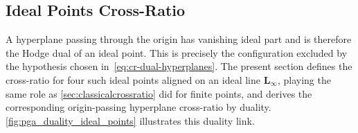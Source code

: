 \documentclass{birkjour}
\theoremstyle{definition}
\theoremstyle{remark}
\begin{document}
\subsection{Ideal Points Cross-Ratio}
\label{sec:ideal-cr}

A hyperplane passing through the origin has vanishing ideal part and is therefore the Hodge dual of an ideal point. This is precisely the configuration excluded by the hypothesis chosen in~\eqref{eq:cr-dual-hyperplanes}. The present section defines the cross-ratio for four such ideal points aligned on an ideal line $\mathbf{L}_\infty$, playing the same role as \cref{sec:classicalcrossratio} did for finite points, and derives the corresponding origin-passing hyperplane cross-ratio by duality. \cref{fig:pga_duality_ideal_points} illustrates this duality link.
\end{document}
